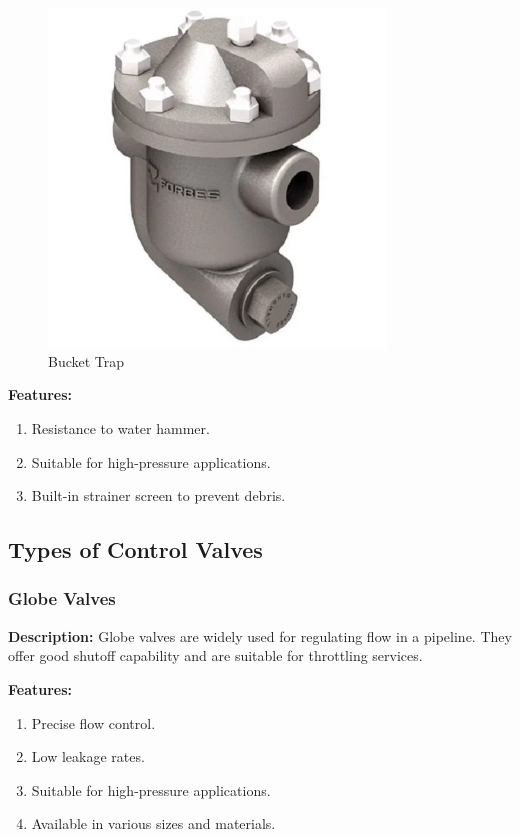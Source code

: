 \begin{figure}[h]
    \centering
    \includegraphics[width=0.8\textwidth,height=0.33\textheight,keepaspectratio]{figs/lastmin/bucket_trap.png}
    \caption{Bucket Trap}
    \label{fig:bucket_trap}
\end{figure}

\textbf{Features:}
\begin{enumerate}
    \item Resistance to water hammer.
    \item Suitable for high-pressure applications.
    \item Built-in strainer screen to prevent debris.
\end{enumerate}

\subsection{Types of Control Valves}

\subsubsection{Globe Valves}

\textbf{Description:} Globe valves are widely used for regulating flow in a pipeline. They offer good shutoff capability and are suitable for throttling services.

\textbf{Features:}
\begin{enumerate}
    \item Precise flow control.
    \item Low leakage rates.
    \item Suitable for high-pressure applications.
    \item Available in various sizes and materials.
\end{enumerate}
